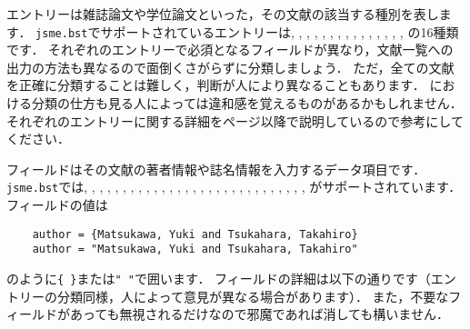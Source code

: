 \documentclass[a4paper,fleqn,uplatex,dvipdfmx]{jsarticle}
\newcommand{\jsmefile}{\texttt{jsme.bst}}
\begin{document}
エントリーは雑誌論文や学位論文といった，その文献の該当する種別を表します．
\jsmefile でサポートされているエントリーは\hyperref[ssec:article]{\ttarticle}, \hyperref[ssec:book]{\ttbook}, \hyperref[ssec:booklet]{\ttbooklet}, \hyperref[ssec:comment]{\ttcomment}, \hyperref[ssec:conference]{\ttconference}, \hyperref[ssec:inbook]{\ttinbook}, \hyperref[ssec:incollection]{\ttincollection}, \hyperref[ssec:inproceedings]{\ttinproceedings}, \hyperref[ssec:manual]{\ttmanual}, \hyperref[ssec:mastersthesis]{\ttmastersthesis}, \hyperref[ssec:misc]{\ttmisc}, \hyperref[ssec:online]{\ttonline}, \hyperref[ssec:phdthesis]{\ttphdthesis}, \hyperref[ssec:proceedings]{\ttproceedings}, \hyperref[ssec:techreport]{\tttechreport}, \hyperref[ssec:unpublished]{\ttunpublished}の16種類です．
それぞれのエントリーで必須となるフィールドが異なり，文献一覧への出力の方法も異なるので面倒くさがらずに分類しましょう．
ただ，全ての文献を正確に分類することは難しく，判断が人により異なることもあります．
\JSMErepos における分類の仕方も見る人によっては違和感を覚えるものがあるかもしれません．
それぞれのエントリーに関する詳細を\pageref{ssec:article}ページ以降で説明しているので参考にしてください．

フィールドはその文献の著者情報や誌名情報を入力するデータ項目です．
\jsmefile では\ttaccess, \ttaddress, \ttarchivePrefix, \ttauthor, \ttbooktitle, \ttchapter, \ttdoi, \ttedition, \tteditor, \tteprint, \tthowpublished, \ttinstitution, \ttjournal, \ttkey, \ttlangid, \ttlanguage, \ttmonth, \ttnote, \ttnumber, \ttorganization, \ttpages, \ttpublisher, \ttschool, \ttseries, \tttitle, \tttype, \tturl, \ttvolume, \ttyear, \ttyomi がサポートされています．
フィールドの値は
\begin{verbatim}
    author = {Matsukawa, Yuki and Tsukahara, Takahiro}
    author = "Matsukawa, Yuki and Tsukahara, Takahiro"
\end{verbatim}
のように\verb|{ }|または\verb|" "|で囲います．
フィールドの詳細は以下の通りです（エントリーの分類同様，人によって意見が異なる場合があります）．
また，不要なフィールドがあっても無視されるだけなので邪魔であれば消しても構いません．
\end{document}
